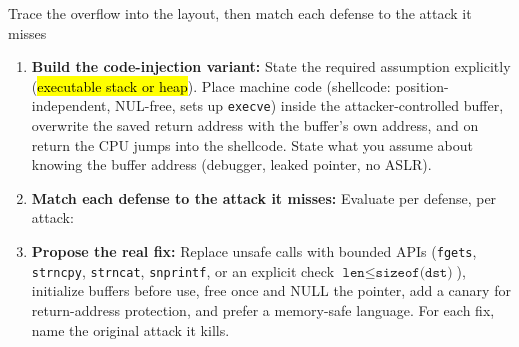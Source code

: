 \documentclass[12pt, a4paper]{article}
\newcommand{\term}[1]{\textbf{\textit{#1}}}        %
\newcommand{\imp}[1]{\hl{#1}}                       %
\begin{document}
\begin{schemebox}{Trace the overflow into the layout, then match each defense to the attack it misses}
\begin{enumerate}[label=\textbf{Step \arabic*:}, leftmargin=*]
    Return hijack: padding up to the saved return address, then the target address (e.g. the existing privileged function) in \term{little-endian} order, plus optional extra words that the target will read as arguments. Pointer retargeting: filler, then the address of the attacker's own buffer.
    \item \textbf{Build the code-injection variant:} State the required assumption explicitly (\imp{executable stack or heap}). Place machine code (shellcode: position-independent, NUL-free, sets up \texttt{execve}) inside the attacker-controlled buffer, overwrite the saved return address with the buffer's own address, and on return the CPU jumps into the shellcode. State what you assume about knowing the buffer address (debugger, leaked pointer, no ASLR).
    \item \textbf{Match each defense to the attack it misses:} Evaluate per defense, per attack:
    \item \textbf{Propose the real fix:} Replace unsafe calls with bounded APIs (\texttt{fgets}, \texttt{strncpy}, \texttt{strncat}, \texttt{snprintf}, or an explicit check $\texttt{len} \leq \texttt{sizeof(dst)}$), initialize buffers before use, free once and NULL the pointer, add a canary for return-address protection, and prefer a memory-safe language. For each fix, name the original attack it kills.
\end{enumerate}
\end{schemebox}
\end{document}
